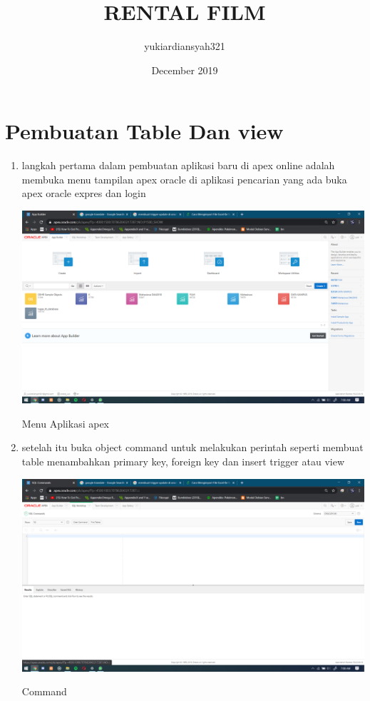 \documentclass{article}
\title{RENTAL FILM}
\author{yukiardiansyah321 }
\date{December 2019}
\begin{document}
\maketitle

\section{Pembuatan Table Dan view }

\begin{enumerate}
    \item langkah pertama dalam pembuatan aplikasi baru di apex online adalah membuka menu tampilan apex oracle di aplikasi pencarian yang ada buka apex oracle expres dan login
    
    \begin{center}
         \centering
            \includegraphics[scale=0.27]{figures/0.PNG}
        \caption{Menu Aplikasi apex}
        \label{excel}
    \end{center}
       
     \item setelah itu buka object command untuk melakukan perintah seperti membuat table menambahkan
     primary key, foreign key dan insert trigger atau view
      
    \begin{center}
         \centering
            \includegraphics[scale=0.27]{figures/8.PNG}
        \caption{Command }
        \label{create}
    \end{center}
    

\end{enumerate}
\end{document}
